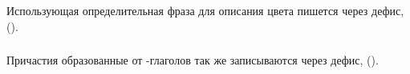 \subsubsection{} Использующая   определительная фраза для описания цвета
пи\-шет\-ся через дефис,   ().

\subsubsection{} Причастия образованные от  -глаголов так же записываются через дефис,  
().

